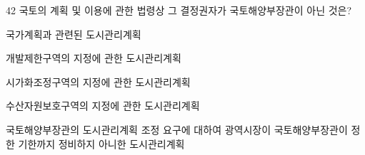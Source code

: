 \begin{question}{42}
국토의 계획 및 이용에 관한 법령상 그 결정권자가 국토해양부장관이 아닌 것은?
\begin{choices}
  \item 국가계획과 관련된 도시관리계획
  \item 개발제한구역의 지정에 관한 도시관리계획
  \item 시가화조정구역의 지정에 관한 도시관리계획
  \item 수산자원보호구역의 지정에 관한 도시관리계획
  \item 국토해양부장관의 도시관리계획 조정 요구에 대하여 광역시장이 국토해양부장관이 정한 기한까지 정비하지 아니한 도시관리계획
\end{choices}
\end{question}
